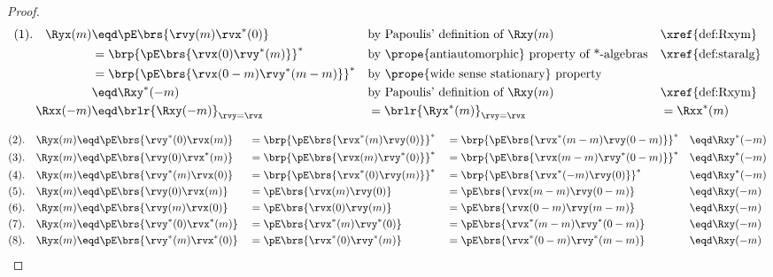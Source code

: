 \begin{proof}
\begin{align*}
    (1).\quad\Ryx(m)
      &\eqd \pE\brs{\rvy(m)\rvx^\ast(0)}
      && \text{by Papoulis' definition of $\Rxy(m)$}                           && \text{\xref{def:Rxym}}
    \\&= \brp{\pE\brs{\rvx(0)\rvy^\ast(m)}}^\ast
      && \text{by \prope{antiautomorphic} property of *-algebras}              && \text{\xref{def:staralg}}
    \\&= \brp{\pE\brs{\rvx(0-m)\rvy^\ast(m-m)}}^\ast
      && \text{by \prope{wide sense stationary} property}
    \\&\eqd \Rxy^\ast(-m)
      && \text{by Papoulis' definition of $\Rxy(m)$}                           && \text{\xref{def:Rxym}}
    \\
    \Rxx(-m)
      &\eqd \brlr{\Rxy(-m)}_{\rvy=\rvx}
     &&= \brlr{\Ryx^\ast(m)}_{\rvy=\rvx}
     &&= \Rxx^\ast(m)
\end{align*}

\begin{align*}
    (2).\quad\Ryx(m)
      &\eqd \pE\brs{\rvy^\ast(0)\rvx(m)}
     &&=\brp{\pE\brs{\rvx^\ast(m)\rvy(0)}}^\ast
     &&=\brp{\pE\brs{\rvx^\ast(m-m)\rvy(0-m)}}^\ast
     &&\eqd \Rxy^\ast(-m)
    \\
    (3).\quad\Ryx(m)
      &\eqd \pE\brs{\rvy(0)\rvx^\ast(m)}
     &&=\brp{\pE\brs{\rvx(m)\rvy^\ast(0)}}^\ast
     &&=\brp{\pE\brs{\rvx(m-m)\rvy^\ast(0-m)}}^\ast
     &&\eqd \Rxy^\ast(-m)
    \\
    (4).\quad\Ryx(m)
      &\eqd \pE\brs{\rvy^\ast(m)\rvx(0)}
     &&=\brp{\pE\brs{\rvx^\ast(0)\rvy(m)}}^\ast
     &&=\brp{\pE\brs{\rvx^\ast(-m)\rvy(0)}}^\ast
     &&\eqd \Rxy^\ast(-m)
    \\
    (5).\quad\Ryx(m)
      &\eqd  \pE\brs{\rvy(0)\rvx(m)}
     &&=     \pE\brs{\rvx(m)\rvy(0)}
     &&=     \pE\brs{\rvx(m-m)\rvy(0-m)}
     &&\eqd \Rxy(-m)
    \\
    (6).\quad\Ryx(m)
      &\eqd  \pE\brs{\rvy(m)\rvx(0)}
     &&=     \pE\brs{\rvx(0)\rvy(m)}
     &&=     \pE\brs{\rvx(0-m)\rvy(m-m)}
     &&\eqd \Rxy(-m)
    \\
    (7).\quad\Ryx(m)
      &\eqd  \pE\brs{\rvy^\ast(0)\rvx^\ast(m)}
     &&=     \pE\brs{\rvx^\ast(m)\rvy^\ast(0)}
     &&=     \pE\brs{\rvx^\ast(m-m)\rvy^\ast(0-m)}
     &&\eqd \Rxy(-m)
    \\
    (8).\quad\Ryx(m)
      &\eqd  \pE\brs{\rvy^\ast(m)\rvx^\ast(0)}
     &&=     \pE\brs{\rvx^\ast(0)\rvy^\ast(m)}
     &&=     \pE\brs{\rvx^\ast(0-m)\rvy^\ast(m-m)}
     &&\eqd \Rxy(-m)
\end{align*}

\end{proof}

